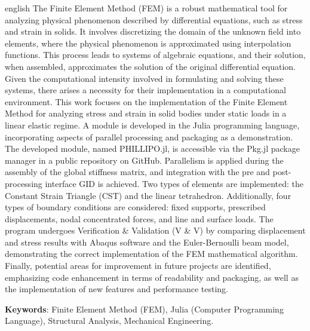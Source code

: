 

\begin{resumo}[Abstract]
 \begin{otherlanguage*}{english}
  The Finite Element Method (FEM) is a robust mathematical tool for analyzing physical phenomenon described by differential equations, such as stress and strain in solids. It involves discretizing the domain of the unknown field into elements, where the physical phenomenon is approximated using interpolation functions. This process leads to systems of algebraic equations, and their solution, when assembled, approximates the solution of the original differential equation. Given the computational intensity involved in formulating and solving these systems, there arises a necessity for their implementation in a computational environment. This work focuses on the implementation of the Finite Element Method for analyzing stress and strain in solid bodies under static loads in a linear elastic regime. A module is developed in the Julia programming language, incorporating aspects of parallel processing and packaging as a demonstration. The developed module, named PHILLIPO.jl, is accessible via the Pkg.jl package manager in a public repository on GitHub. Parallelism is applied during the assembly of the global stiffness matrix, and integration with the pre and post-processing interface GID is achieved. Two types of elements are implemented: the Constant Strain Triangle (CST) and the linear tetrahedron. Additionally, four types of boundary conditions are considered: fixed supports, prescribed displacements, nodal concentrated forces, and line and surface loads. The program undergoes Verification \& Validation (V \& V) by comparing displacement and stress results with Abaqus software and the Euler-Bernoulli beam model, demonstrating the correct implementation of the FEM mathematical algorithm. Finally, potential areas for improvement in future projects are identified, emphasizing code enhancement in terms of readability and packaging, as well as the implementation of new features and performance testing.
  
  \textbf{Keywords}: Finite Element Method (FEM), Julia (Computer Programming Language), Structural Analysis, Mechanical Engineering.
 \end{otherlanguage*}
\end{resumo}
